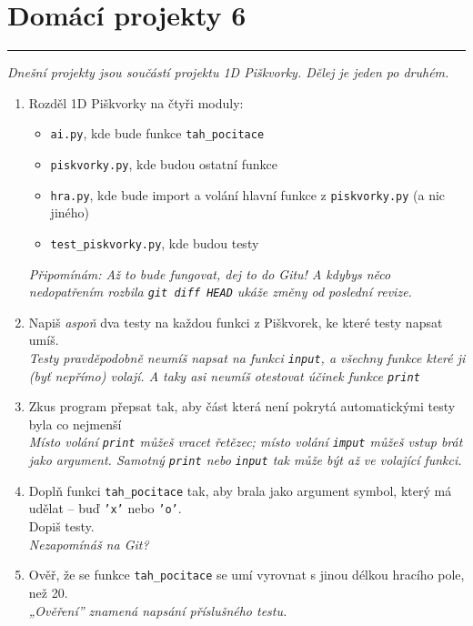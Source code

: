 \documentclass[a4paper,10pt]{article}
\newcommand\plsetno{6}
\newcommand\startsection[1]{
     \vspace{0.2ex}
    \hrule
    {\fontspec{Oxygen} \tiny
     \vspace{-1ex}
     \emph{#1}
     \vspace{-1.5em}
    }
}
\begin{document}
\section*{Domácí projekty \plsetno}

\startsection{Dnešní projekty jsou součástí projektu 1D Piškvorky. Dělej je jeden po druhém.}

\begin{enumerate}
\item Rozděl 1D Piškvorky na čtyři moduly:
    \begin{itemize}
        \item \texttt{ai.py}, kde bude funkce \texttt{tah\_pocitace}
        \item \texttt{piskvorky.py}, kde budou ostatní funkce
        \item \texttt{hra.py}, kde bude import a volání hlavní funkce z \texttt{piskvorky.py} (a nic jiného)
        \item \texttt{test\_piskvorky.py}, kde budou testy
    \end{itemize}
    \emph{\small Připomínám: Až to bude fungovat, dej to do Gitu! A kdybys něco nedopatřením rozbila \texttt{git diff HEAD} ukáže změny od poslední revize.}

\item Napiš \emph{aspoň} dva testy na každou funkci z Piškvorek, ke které testy napsat umíš.
    \\\emph{\small Testy pravděpodobně neumíš napsat na funkci \texttt{input}, a všechny funkce které ji (byť nepřímo) volají.
            A taky asi neumíš otestovat účinek funkce \texttt{print}}

\item Zkus program přepsat tak, aby část která není pokrytá automatickými testy byla co nejmenší
    \\\emph{\small Místo volání \texttt{print} můžeš vracet řetězec;
            místo volání \texttt{imput} můžeš vstup brát jako argument.
            Samotný \texttt{print} nebo \texttt{input} tak může být až ve volající funkci.}

\item Doplň funkci \texttt{tah\_pocitace} tak, aby brala jako argument symbol, který má udělat – buď \texttt{'x'} nebo \texttt{'o'}.
    \\Dopiš testy.
    \\\emph{\small Nezapomínáš na Git?}

\item Ověř, že se funkce \texttt{tah\_pocitace} se umí vyrovnat s jinou délkou hracího pole, než 20.
    \\\emph{\small „Ověření” znamená napsání příslušného testu.}


\end{enumerate}
\end{document}
